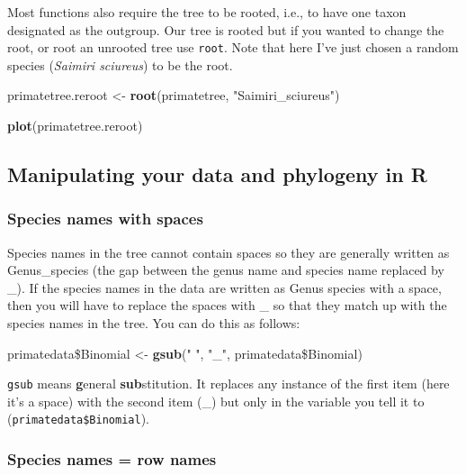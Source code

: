 \documentclass[12pt]{article}
\newcommand{\KeywordTok}[1]{\textcolor[rgb]{0.13,0.29,0.53}{\textbf{{#1}}}}
\newcommand{\StringTok}[1]{\textcolor[rgb]{0.31,0.60,0.02}{{#1}}}
\newcommand{\NormalTok}[1]{{#1}}
\begin{document}
Most functions also require the tree to be rooted, i.e., to have one taxon designated as the outgroup. Our tree is rooted but if you wanted to change the root, or root an unrooted tree use \texttt{root}. Note that here I've just chosen a random species (\textit{Saimiri sciureus}) to be the root.

\begin{snugshade}
\begin{Highlighting}[]
\NormalTok{primatetree.reroot <-}\StringTok{ }\KeywordTok{root}\NormalTok{(primatetree, }\StringTok{"Saimiri_sciureus"}\NormalTok{)  }

\KeywordTok{plot}\NormalTok{(primatetree.reroot)}
\end{Highlighting}
\end{snugshade}

\subsection{Manipulating your data and phylogeny in R}

\subsubsection{Species names with spaces} 
Species names in the tree cannot contain spaces so they are generally written as Genus\_species (the gap between the genus name and species name replaced by \_). If the species names in the data are written as Genus species with a space, then you will have to replace the spaces with \_ so that they match up with the species names in the tree. You can do this as follows:

\begin{snugshade}
\begin{Highlighting}[]
\NormalTok{primatedata\$Binomial <-}\StringTok{ }\KeywordTok{gsub}\NormalTok{(}\StringTok{" "}\NormalTok{, }\StringTok{"_"}\NormalTok{, primatedata\$Binomial)}
\end{Highlighting}
\end{snugshade}

\texttt{gsub} means \textbf{g}eneral \textbf{sub}stitution. It replaces any instance of the first item (here it’s a space) with the second item (\_) but only in the variable you tell it to (\texttt{primatedata\$Binomial}).

\subsubsection{Species names = row names}
\end{document}

